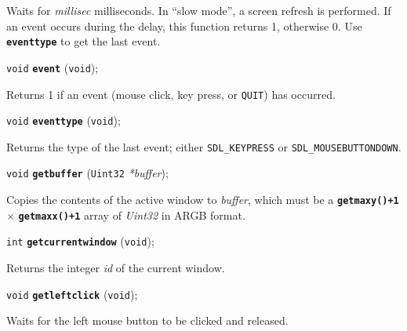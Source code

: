 \documentclass[a4paper,12pt]{article}
\newcommand{\V}{\texttt{void}}      %
\newcommand{\I}{\texttt{int}}       %
\newcommand{\Ut}{\texttt{Uint32}}   %
\newcommand{\func}[1]{\textbf{\texttt{#1}}}  %
\newcommand{\A}[1]{\emph{#1}}       %
\newcommand{\T}[1]{\texttt{#1}}     %
\newenvironment{bgi}
{ %
  \begin{snugshade}
}
{ %
  \end{snugshade}
}
\begin{document}
Waits for \A{millisec} milliseconds. In ``slow mode'', a screen
refresh is performed. If an event occurs during the delay, this
function returns 1, otherwise 0. Use \func{eventtype} to get the last
event.


\label{sec:event}

\begin{bgi}
\V{} \func{event} (\V{});
\end{bgi}

Returns 1 if an event (mouse click, key press, or \T{QUIT}) has occurred.


\label{sec:eventtype}

\begin{bgi}
\V{} \func{eventtype} (\V{});
\end{bgi}

Returns the type of the last event; either \T{SDL\_KEYPRESS} or
\T{SDL\_MOUSEBUTTONDOWN}.


\label{sec:getbuffer}

\begin{bgi}
\V{} \func{getbuffer} (\Ut{} \A{*buffer});
\end{bgi}

Copies the contents of the active window to \A{buffer}, which must be
a \func{getmaxy()+1} $\times$ \func{getmaxx()+1} array of \A{Uint32}
in ARGB format.


\label{sec:getcurrentwindow}

\begin{bgi}
\I{} \func{getcurrentwindow} (\V{});
\end{bgi}

Returns the integer \A{id} of the current window.


\label{sec:getleftclick}

\begin{bgi}
\V{} \func{getleftclick} (\V{});
\end{bgi}

Waits for the left mouse button to be clicked and released.
\end{document}
